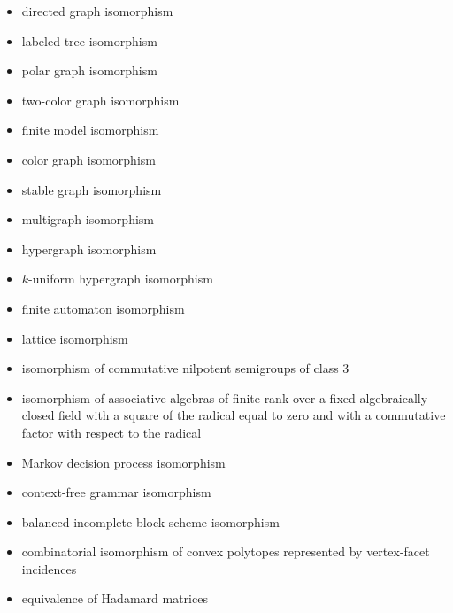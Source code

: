 \documentclass{article}
\theoremstyle{definition} \newtheorem{definition}[definition]{Definition}
\begin{document}
\begin{itemize}
\item directed graph isomorphism \cite{miller79}
\item labeled tree isomorphism \cite{babai79}
\item polar graph isomorphism \cite{zkt85}
\item two-color graph isomorphism \cite{zkt85}
\item finite model isomorphism \cite{miller79} %
\item color graph isomorphism \cite{zkt85, miller77, pultr64}
\item stable graph isomorphism \cite{wl68}
\item multigraph isomorphism \cite{zkt85} 
\item hypergraph isomorphism \cite{zkt85} 
\item $k$-uniform hypergraph isomorphism \cite{zkt85, hn70}
\item finite automaton isomorphism \cite{booth78}
\item lattice isomorphism \cite{frucht50}
\item isomorphism of commutative nilpotent semigroups of class 3 
\item isomorphism of associative algebras of finite rank over a fixed
  algebraically closed field with a square of the radical equal to zero and
  with a commutative factor with respect to the radical \cite{grigoriev83}
\item Markov decision process isomorphism \cite{nr08}
\item context-free grammar isomorphism
\item balanced incomplete block-scheme isomorphism \cite{cc81}
\item combinatorial isomorphism of convex polytopes represented by
  vertex-facet incidences \cite{ks03}
\item equivalence of Hadamard matrices \cite{mckay79}
\end{itemize}
\end{document}

